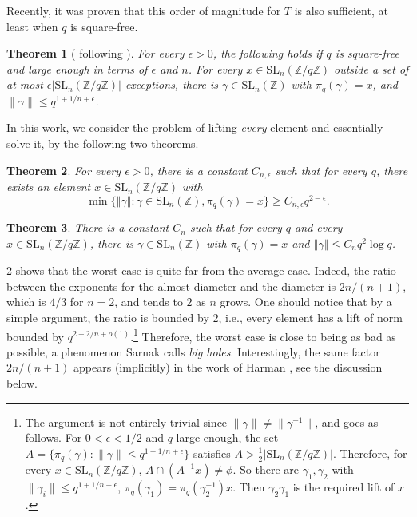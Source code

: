 \documentclass[12pt, a4paper]{amsart}
\numberwithin{equation}{section}
\newtheorem{theorem}{Theorem}[section]
\theoremstyle{definition}
\newcommand{\Z}{\mathbb{Z}}
\newcommand{\SL}{\mathrm{SL}}
\newcommand{\n}[1]{\left\Vert #1\right\Vert }
\begin{document}
Recently, it was proven that this order of magnitude for $T$ is also sufficient,
at least when $q$ is square-free.
\begin{theorem}[\cite{jana2022eisenstein-average} following \cite{assing2022density}]
\label{thm:average case} For every $\epsilon>0$, the following holds if $q$ is square-free and large enough in terms of $\epsilon$ and $n$.
For every $x\in\SL_{n}(\Z/q\Z)$
outside a set of at most $\epsilon\left|\SL_{n}(\Z/q\Z)\right|$
exceptions, there is $\gamma\in\SL_{n}(\Z)$ with $\pi_{q}(\gamma)=x$,
and $\|\gamma\|\le q^{1+1/n+\epsilon}$.
\end{theorem}

In this work, we consider the problem of lifting \emph{every} element and essentially solve it, by the following two theorems.
\begin{theorem}
\label{thm:lower bound}For every $\epsilon>0$, there is a constant
$C_{n,\epsilon}$ such that for every $q$, there exists an element $x\in\SL_{n}(\Z/q\Z)$
with 
\[
\min\{\n{\gamma}:\gamma\in\SL_{n}(\Z),\pi_{q}(\gamma)=x\}\ge C_{n,\epsilon}q^{2-\epsilon}.
\]
\end{theorem}

\begin{theorem}
\label{thm:upper bound}There is a constant $C_{n}$ such that for
every $q$ and every $x\in\SL_{n}(\Z/q\Z)$, there is $\gamma\in\SL_{n}(\Z)$
with $\pi_{q}(\gamma)=x$ and $\n{\gamma}\le C_{n}q^{2}\log q$. 
\end{theorem}

\cref{thm:lower bound}  shows that the worst case is quite far from the average case. Indeed, the ratio between the exponents for the almost-diameter and the diameter is $2n/(n+1)$, which is $4/3$ for $n=2$, and tends to $2$ as $n$ grows. One should notice that by a simple argument, the ratio is bounded by $2$, i.e., every element has a lift of norm bounded by $q^{2+2/n+o(1)}$.\footnote{The argument is not entirely trivial since $\|\gamma\|\ne \|\gamma^{-1}\|$, and goes as follows. For $0<\epsilon<1/2$ and $q$ large enough, the set $A=\{\pi_q(\gamma):\|\gamma\|\le q^{1+1/n+\epsilon}\}$ satisfies $A>\frac{1}{2}|\SL_n(\Z/q\Z)|$. Therefore, for every $x\in \SL_n(\Z/q\Z)$, $A\cap (A^{-1}x)\ne \phi$. So there are $\gamma_1,\gamma_2$ with $\|\gamma_i\|\le q^{1+1/n+\epsilon}$, $\pi_q(\gamma_1)= \pi_q(\gamma_2^{-1})x$. Then $\gamma_2\gamma_1$ is the required lift of $x$.}
Therefore, the worst case is close to being as bad as possible, a phenomenon Sarnak calls \emph{big holes}. Interestingly, the same factor $2n/(n+1)$ appears (implicitly) in the work of Harman \cite{harman1990approximation}, see the discussion below.
\end{document}
